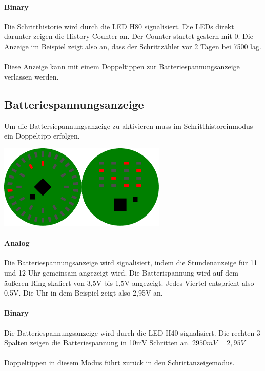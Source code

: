 \paragraph{Binary}
Die Schritthistorie wird durch die LED H80 signalisiert.
Die LEDs direkt darunter zeigen die History Counter an. Der Counter startet gestern mit 0.
Die Anzeige im Beispiel zeigt also an, dass der Schrittzähler vor 2 Tagen bei 7500 lag.\\
\\
Diese Anzeige kann mit einem Doppeltippen zur Batteriespannungsanzeige verlassen werden.
\subsection{Batteriespannungsanzeige}
Um die Battersiepannungsanzeige zu aktivieren muss im Schritthistoreinmodus ein Doppeltipp erfolgen.
\begin{center}
\includegraphics[width=0.6\textwidth]{../Graphics/ShowUBatt_2950mV}
\end{center}
\paragraph{Analog}
Die Batteriespannungsanzeige wird signalisiert, indem die Stundenanzeige für 11 und 12 Uhr gemeinsam angezeigt wird.
Die Batterispannung wird auf dem äußeren Ring skaliert von 3,5V bis 1,5V angezeigt. Jedes Viertel entspricht also 0,5V.
Die Uhr in dem Beispiel zeigt also 2,95V an.

\paragraph{Binary}
Die Batteriespannungsanzeige wird durch die LED H40 signalisiert.
Die rechten 3 Spalten zeigen die Batteriespannung in 10mV Schritten an.
$2950mV=2,95V$\\
\\
Doppeltippen in diesem Modus führt zurück in den Schrittanzeigemodus.